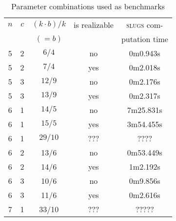 \documentclass[a4paper,conference,10pt]{IEEEtran}
\begin{document}


%
\begin{table}[b]
\normalsize
\begin{center}
\begin{tabular}{c|c|c||c|c}
$n$ & $c$ & $(k \cdot b)/k$ & is realizable & \textsc{slugs} com- \\ & & $(=b)$ & & putation time\\ \hline \hline
5 & 2 & $6/{4}$ & no &	0m0.943s \\ \hline
5 & 2 & $7/{4}$ & yes & 0m2.018s \\ \hline
5 & 3 & $12/{9}$ & no & 0m2.176s \\ \hline
5 & 3 & $13/{9}$ & yes & 0m2.317s\\ \hline
6 & 1 & $14/{5}$ & no & 7m25.831s \\ \hline
6 & 1 & $15/{5}$ & yes & 3m54.455s \\ \hline
6 & 1 & $29/{10}$ & ??? & ???? \\ \hline
6 & 2 & 13/6 & no & 0m53.449s \\ \hline
6 & 2 & 14/6 & yes &1m2.192s\\ \hline
6 & 3 & 10/6 & no & 0m9.856s\\ \hline
6 & 3 & 11/6 & yes & 0m2.616s \\ \hline
7 & 1 & 33/10 & ??? & ?????
\end{tabular}
\end{center}
\caption{Parameter combinations used as benchmarks}
\label{tab:benchmarks}
\end{table}
\end{document}
